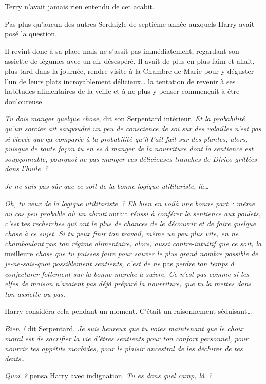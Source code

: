 \later

Terry n'avait jamais rien entendu de cet acabit.

Pas plus qu'aucun des autres Serdaigle de septième année auxquels Harry avait posé la question.

Il revint donc à sa place mais ne s'assit pas immédiatement, regardant son assiette de légumes avec un air désespéré. Il avait de plus en plus faim et allait, plus tard dans la journée, rendre visite à la Chambre de Marie pour y déguster l'un de leurs plats incroyablement délicieux… la tentation de revenir à ses habitudes alimentaires de la veille et à ne plus y penser commençait à être douloureuse.

\emph{Tu dois manger quelque chose}, dit son Serpentard intérieur. \emph{Et la probabilité qu'un sorcier ait saupoudré un peu de conscience de soi sur des volailles n'est pas si élevée que} ça \emph{comparée à la probabilité qu'il l'ait fait sur des plantes, alors, puisque de toute façon tu en es à manger de la nourriture dont la sentience est soupçonnable, pourquoi ne pas manger ces délicieuses tranches de Dirico grillées dans l'huile~?}

\emph{Je ne suis pas sûr que ce soit de la bonne logique utilitariste, là…}

\emph{Oh, tu veux de la logique utilitariste~? Eh bien en voilà une bonne part~: même au cas peu probable où un abruti} aurait \emph{réussi à conférer la sentience aux poulets, c'est} tes \emph{recherches qui ont le plus de chances de le découvrir et de faire quelque chose à ce sujet. Si tu peux finir ton travail, même un peu plus vite, en ne chamboulant} pas \emph{ton régime alimentaire, alors, aussi contre-intuitif que ce soit, la} meilleure \emph{chose que tu puisses faire pour sauver le plus grand nombre possible de je-ne-sais-quoi possiblement sentients, c'est de ne} pas \emph{perdre ton temps à conjecturer follement sur la bonne marche à suivre. Ce n'est pas comme si les elfes de maison n'avaient pas déjà préparé la nourriture, que tu la mettes dans ton assiette ou pas.}

Harry considéra cela pendant un moment. C'était un raisonnement séduisant…

\emph{Bien~!} dit Serpentard. \emph{Je suis heureux que tu voies maintenant que le choix moral est de sacrifier la vie d'êtres sentients pour ton confort personnel, pour nourrir tes appétits morbides, pour le plaisir ancestral de les déchirer de tes dents…}

\emph{Quoi~?} pensa Harry avec indignation. \emph{Tu es dans quel camp, là~?}

